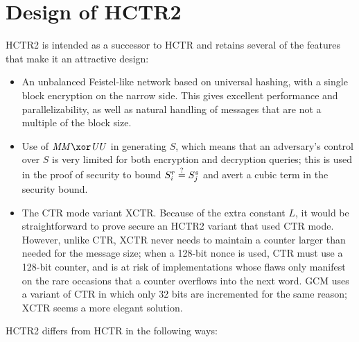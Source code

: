 \documentclass[hctr2.tex]{subfiles}
\begin{document}
\section{Design of HCTR2}\label{design}
HCTR2 is intended as a successor to HCTR and retains several of the
features that make it an attractive design:
\begin{itemize}
    \item An unbalanced Feistel-like network based on universal
    hashing, with a single block encryption on the narrow side.
    This gives excellent performance and parallelizability,
    as well as natural handling of messages that are not
    a multiple of the block size. 
    \item Use of \(\MM \xor \UU\) in generating \(S\), which means
    that an adversary's control over \(S\) is very limited for both
    encryption and decryption queries; this is used in the
    proof of security to bound \(S_i^r \stackrel{\text{?}}{=} S_j^s\)
    and avert a cubic term in the security bound.
    \item The CTR mode variant XCTR.
    Because of the extra constant \(L\), it would be straightforward
    to prove secure an HCTR2 variant that used CTR mode.
    However, unlike CTR, XCTR
    never needs to maintain a counter larger
    than needed for the message size;
    when a 128-bit nonce is used, CTR 
    must use a 128-bit counter, and is
    at risk of implementations
    whose flaws only manifest on the
    rare occasions that a counter overflows
    into the next word.
    GCM\cite{gcm} uses a variant of CTR
    in which only 32 bits are incremented
    for the same reason;
    XCTR seems a more elegant solution.
\end{itemize}

HCTR2 differs from HCTR in the following ways:
\end{document}
